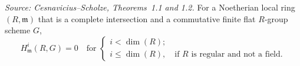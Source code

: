 \begin{theorem}
  \label{thm:main}
  \textit{Source: Cesnavicius--Scholze, Theorems~1.1 and 1.2.}
  For a Noetherian local ring \((R, \mathfrak{m})\) that is a complete intersection and a commutative finite flat \(R\)-group scheme \(G\),
  \[
    H^i_{\mathfrak{m}}(R, G) = 0 \quad \text{for } \begin{cases} i < \dim(R); \\ i \le \dim(R), \quad \text{if } R \text{ is regular and not a field.} \end{cases}
  \]
\end{theorem}

